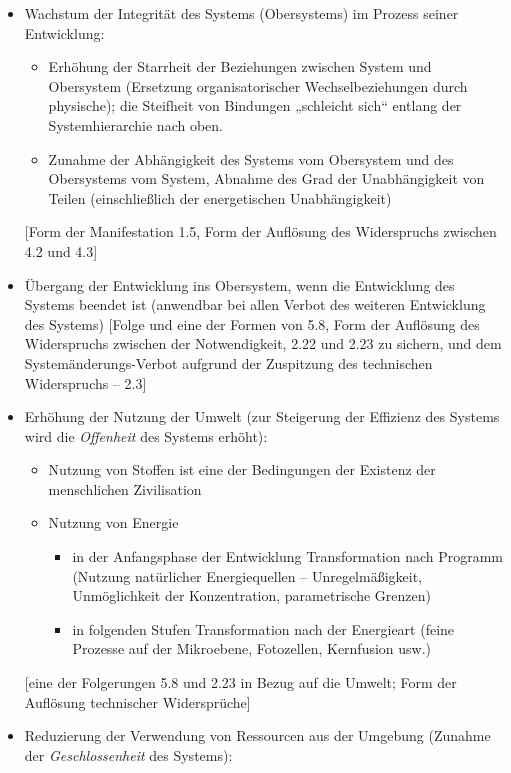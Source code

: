 \documentclass[11pt,a4paper]{article}
\begin{document}
\begin{itemize}
\item[5.8.] Wachstum der Integrität des Systems (Obersystems) im Prozess
  seiner Entwicklung:
  \begin{itemize}
    \item Erhöhung der Starrheit der Beziehungen zwischen System und
      Obersystem (Ersetzung organisatorischer Wechselbeziehungen durch
      physische); die Steifheit von Bindungen „schleicht sich“ entlang der
      Systemhierarchie nach oben.
    \item Zunahme der Abhängigkeit des Systems vom Obersystem und des
      Obersystems vom System, Abnahme des Grad der Unabhängigkeit von Teilen
      (einschließlich der energetischen Unabhängigkeit)
  \end{itemize}
[Form der Manifestation 1.5, Form der Auf\-lösung des Widerspruchs zwischen
  4.2 und 4.3]
\item[5.9.] Übergang der Entwicklung ins Obersystem, wenn die Entwicklung des
  Systems beendet ist (anwendbar bei allen Verbot des weiteren Entwicklung des
  Systems) [Folge und eine der Formen von 5.8, Form der Auf\-lösung des
    Widerspruchs zwischen der Notwendigkeit, 2.22 und 2.23 zu sichern, und dem
    Systemänderungs-Verbot aufgrund der Zuspitzung des technischen
    Widerspruchs -- 2.3]
\item[5.10.] Erhöhung der Nutzung der Umwelt (zur Steigerung der Effizienz des
  Systems wird die \emph{Offenheit} des Systems erhöht):
\begin{itemize}
  \item Nutzung von Stoffen ist eine der Bedingungen der Existenz der
    menschlichen Zivilisation
  \item Nutzung von Energie 
    \begin{itemize}
    \item in der Anfangsphase der Entwicklung Transformation nach Programm
      (Nutzung natürlicher Energiequellen -- Unregelmäßigkeit, Unmöglichkeit
      der Konzentration, parametrische Grenzen)
    \item in folgenden Stufen Transformation nach der Energieart (feine
      Prozesse auf der Mikroebene, Fotozellen, Kernfusion usw.)
    \end{itemize}
\end{itemize}
[eine der Folgerungen 5.8 und 2.23 in Bezug auf die Umwelt; Form der
  Auf\-lösung technischer Widersprüche]
\item[5.11.] Reduzierung der Verwendung von Ressourcen aus der Umgebung
  (Zunahme der \emph{Geschlossenheit} des Systems):

\end{itemize}
\end{document}
